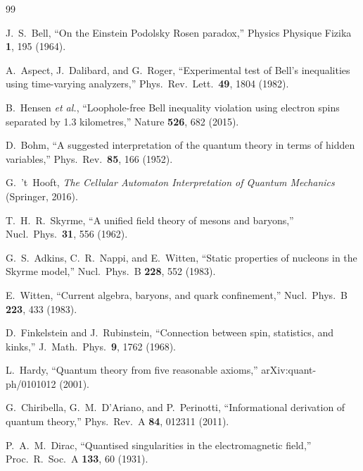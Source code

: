 \documentclass[11pt,a4paper]{article}
\begin{document}
\begin{thebibliography}{99}

 J.~S.~Bell, ``On the Einstein Podolsky Rosen paradox,'' Physics Physique Fizika \textbf{1}, 195 (1964).

 A.~Aspect, J.~Dalibard, and G.~Roger, ``Experimental test of Bell's inequalities using time-varying analyzers,'' Phys.\ Rev.\ Lett.\ \textbf{49}, 1804 (1982).

 B.~Hensen \emph{et al.}, ``Loophole-free Bell inequality violation using electron spins separated by 1.3 kilometres,'' Nature \textbf{526}, 682 (2015).

 D.~Bohm, ``A suggested interpretation of the quantum theory in terms of hidden variables,'' Phys.\ Rev.\ \textbf{85}, 166 (1952).

 G.~'t~Hooft, \emph{The Cellular Automaton Interpretation of Quantum Mechanics} (Springer, 2016).

 T.~H.~R.~Skyrme, ``A unified field theory of mesons and baryons,'' Nucl.\ Phys.\ \textbf{31}, 556 (1962).

 G.~S.~Adkins, C.~R.~Nappi, and E.~Witten, ``Static properties of nucleons in the Skyrme model,'' Nucl.\ Phys.\ B \textbf{228}, 552 (1983).

 E.~Witten, ``Current algebra, baryons, and quark confinement,'' Nucl.\ Phys.\ B \textbf{223}, 433 (1983).

 D.~Finkelstein and J.~Rubinstein, ``Connection between spin, statistics, and kinks,'' J.\ Math.\ Phys.\ \textbf{9}, 1762 (1968).

 L.~Hardy, ``Quantum theory from five reasonable axioms,'' arXiv:quant-ph/0101012 (2001).

 G.~Chiribella, G.~M.~D'Ariano, and P.~Perinotti, ``Informational derivation of quantum theory,'' Phys.\ Rev.\ A \textbf{84}, 012311 (2011).

 P.~A.~M.~Dirac, ``Quantised singularities in the electromagnetic field,'' Proc.\ R.\ Soc.\ A \textbf{133}, 60 (1931).

\end{thebibliography}
\end{document}
